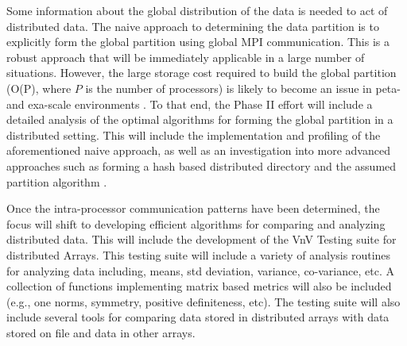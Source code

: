 Some information about the global distribution of the data is needed to act of distributed data. The naive approach to determining the data partition is to explicitly form the global partition using global MPI communication. This is a robust approach that will be immediately applicable in a large number of situations. However, the large storage cost required to build the global partition (O(P), where $P$ is the number of processors) is likely to become an issue in peta- and exa-scale environments \cite{hypre-assumed}. To that end, the Phase II effort will include a detailed analysis of the optimal algorithms for forming the global partition in a distributed setting. This will include the implementation and profiling of the aforementioned naive approach, as well as an investigation into more advanced approaches such as forming a hash based distributed directory \cite{hpre-nine} and the assumed partition algorithm \cite{hypre-assumed}. 


Once the intra-processor communication patterns have been determined, the focus will shift to developing efficient algorithms for comparing and analyzing distributed data. This will include the development of the VnV Testing suite for distributed Arrays. This testing suite will include a variety of analysis routines for analyzing data including, means, std deviation, variance, co-variance, etc. A collection of functions implementing matrix based metrics will also be included (e.g., one norms, symmetry, positive definiteness, etc). The testing suite will also include several tools for comparing data stored in distributed arrays with data stored on file and data in other arrays.


